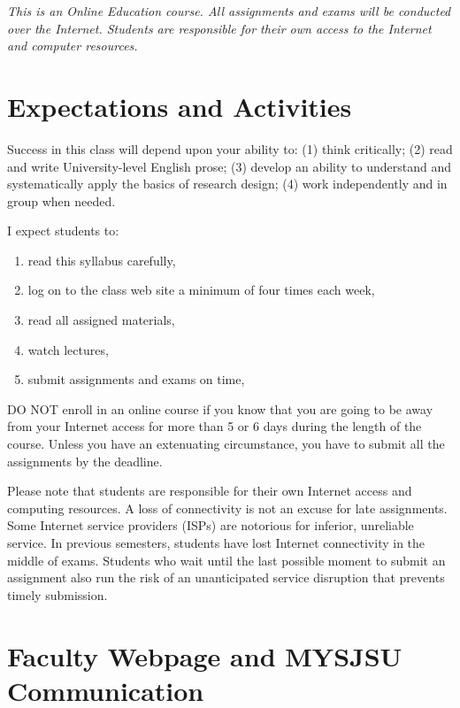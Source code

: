 \documentclass[11pt,]{article}
\providecommand{\tightlist}{%
  \setlength{\itemsep}{0pt}\setlength{\parskip}{0pt}}
\begin{document}
\emph{This is an Online Education course. All assignments and exams will
be conducted over the Internet. Students are responsible for their own
access to the Internet and computer resources.}

\hypertarget{expectations-and-activities}{%
\section{Expectations and
Activities}\label{expectations-and-activities}}

Success in this class will depend upon your ability to: (1) think
critically; (2) read and write University-level English prose; (3)
develop an ability to understand and systematically apply the basics of
research design; (4) work independently and in group when needed.

I expect students to:

\begin{enumerate}
\def\labelenumi{\arabic{enumi})}
\tightlist
\item
  read this syllabus carefully,
\item
  log on to the class web site a minimum of four times each week,
\item
  read all assigned materials,
\item
  watch lectures,
\item
  submit assignments and exams on time,
\end{enumerate}

DO NOT enroll in an online course if you know that you are going to be
away from your Internet access for more than 5 or 6 days during the
length of the course. Unless you have an extenuating circumstance, you
have to submit all the assignments by the deadline.

Please note that students are responsible for their own Internet access
and computing resources. A loss of connectivity is not an excuse for
late assignments. Some Internet service providers (ISPs) are notorious
for inferior, unreliable service. In previous semesters, students have
lost Internet connectivity in the middle of exams. Students who wait
until the last possible moment to submit an assignment also run the risk
of an unanticipated service disruption that prevents timely submission.

\hypertarget{faculty-webpage-and-mysjsu-communication}{%
\section{Faculty Webpage and MYSJSU
Communication}\label{faculty-webpage-and-mysjsu-communication}}
\end{document}

